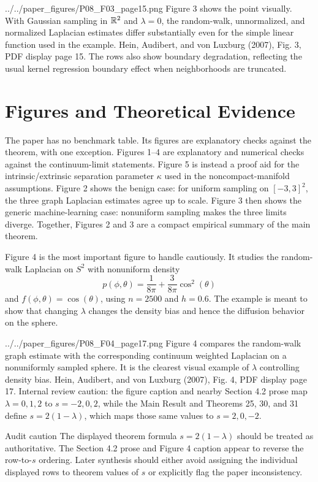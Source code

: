 \documentclass[11pt]{article}
\begin{document}
\paperfigure
  {../../paper_figures/P08_F03_page15.png}
  {Figure 3 shows the point visually.  With Gaussian sampling in $\mathbb{R}^2$ and
  $\lambda=0$, the random-walk, unnormalized, and normalized Laplacian
  estimates differ substantially even for the simple linear function used in
  the example.}
  {Hein, Audibert, and von Luxburg (2007), Fig. 3, PDF display page 15.}
  {The rows also show boundary degradation, reflecting the usual kernel
  regression boundary effect when neighborhoods are truncated.}

\section{Figures and Theoretical Evidence}

The paper has no benchmark table.  Its figures are explanatory checks against
the theorem, with one exception.  Figures 1--4 are explanatory and numerical
checks against the continuum-limit statements. Figure 5 is instead a proof
aid for the intrinsic/extrinsic separation parameter \(\kappa\) used in the
noncompact-manifold assumptions. Figure 2 shows the benign case: for uniform
sampling on \([-3,3]^2\), the three graph Laplacian estimates agree up to
scale.  Figure 3 then shows the generic machine-learning case: nonuniform
sampling makes the three limits diverge.  Together, Figures 2 and 3 are a
compact empirical summary of the main theorem.

Figure 4 is the most important figure to handle cautiously.  It studies the
random-walk Laplacian on $S^2$ with nonuniform density
\[
  p(\phi,\theta)=\frac{1}{8\pi}+\frac{3}{8\pi}\cos^2(\theta)
\]
and $f(\phi,\theta)=\cos(\theta)$, using $n=2500$ and $h=0.6$.  The example
is meant to show that changing $\lambda$ changes the density bias and hence
the diffusion behavior on the sphere.

\paperfigure
  {../../paper_figures/P08_F04_page17.png}
  {Figure 4 compares the random-walk graph estimate with the corresponding
  continuum weighted Laplacian on a nonuniformly sampled sphere.  It is the
  clearest visual example of $\lambda$ controlling density bias.}
  {Hein, Audibert, and von Luxburg (2007), Fig. 4, PDF display page 17.}
  {Internal review caution: the figure caption and nearby Section 4.2 prose
  map $\lambda=0,1,2$ to $s=-2,0,2$, while the Main Result and Theorems 25,
  30, and 31 define $s=2(1-\lambda)$, which maps those same values to
  $s=2,0,-2$.}

\begin{reviewbox}{Audit caution}
The displayed theorem formula $s=2(1-\lambda)$ should be treated as
authoritative.  The Section 4.2 prose and Figure 4 caption appear to reverse
the row-to-$s$ ordering.  Later synthesis should either avoid assigning the
individual displayed rows to theorem values of $s$ or explicitly flag the
paper inconsistency.
\end{reviewbox}
\end{document}
